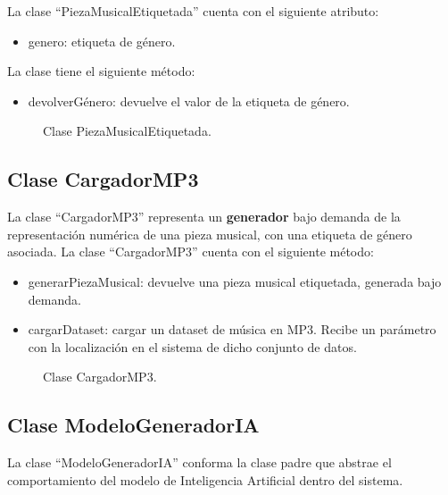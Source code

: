 La clase ``PiezaMusicalEtiquetada'' cuenta con el siguiente atributo:

\begin{itemize}
    \item genero: etiqueta de género.
\end{itemize}

La clase tiene el siguiente método:

\begin{itemize}
    \item devolverGénero: devuelve el valor de la etiqueta de género.
\end{itemize}

\begin{figure}[H]
  \centering
  
  \caption{Clase PiezaMusicalEtiquetada.}
\end{figure}

\subsection{Clase CargadorMP3}

La clase ``CargadorMP3'' representa un \textbf{generador} bajo demanda de la representación numérica de una pieza musical, con una etiqueta de género asociada.
La clase ``CargadorMP3'' cuenta con el siguiente método:

\begin{itemize}
    \item generarPiezaMusical: devuelve una pieza musical etiquetada, generada bajo demanda.
    \item cargarDataset: cargar un dataset de música en MP3. Recibe un parámetro con la localización en el sistema de dicho conjunto de datos.
\end{itemize}

\begin{figure}[H]
  \centering
  
  \caption{Clase CargadorMP3.}
\end{figure}

\subsection{Clase ModeloGeneradorIA}

La clase ``ModeloGeneradorIA'' conforma la clase padre que abstrae el comportamiento del modelo de Inteligencia Artificial dentro del sistema.

